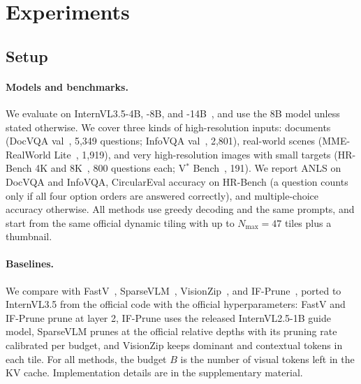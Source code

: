 \section{Experiments}
\label{sec:exp}



\subsection{Setup}
\label{sec:setup}

\paragraph{Models and benchmarks.}
We evaluate on InternVL3.5-4B, -8B, and -14B~\cite{internvl35}, and use the 8B model unless stated
otherwise. We cover three kinds of high-resolution inputs: documents (DocVQA val~\cite{docvqa}, 5,349
questions; InfoVQA val~\cite{infovqa}, 2,801), real-world scenes (MME-RealWorld Lite~\cite{mmerealworld},
1,919), and very high-resolution images with small targets (HR-Bench 4K and 8K~\cite{hrbench}, 800
questions each; V$^*$ Bench~\cite{vstar}, 191). We report ANLS on DocVQA and InfoVQA, CircularEval
accuracy on HR-Bench (a question counts only if all four option orders are answered correctly), and
multiple-choice accuracy otherwise. All methods use greedy decoding and the same prompts, and start
from the same official dynamic tiling with up to $N_{\max}=47$ tiles plus a thumbnail.

\paragraph{Baselines.}
We compare with FastV~\cite{fastv}, SparseVLM~\cite{sparsevlm}, VisionZip~\cite{visionzip}, and
IF-Prune~\cite{ifprune}, ported to InternVL3.5 from the official code with the official
hyperparameters: FastV and IF-Prune prune at layer 2, IF-Prune uses the released InternVL2.5-1B guide
model, SparseVLM prunes at the official relative depths with its pruning rate calibrated per budget,
and VisionZip keeps dominant and contextual tokens in each tile. For all methods, the budget $B$ is the
number of visual tokens left in the KV cache. Implementation details are in the supplementary material.

